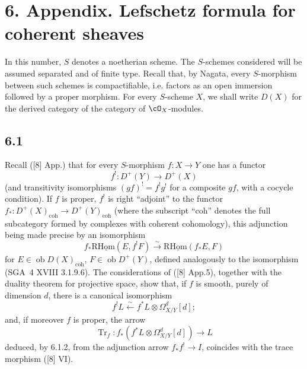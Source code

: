 \section*{6. Appendix. Lefschetz formula for coherent sheaves}

In this number, $S$ denotes a noetherian scheme. The $S$-schemes considered will be assumed separated and of finite type. Recall that, by Nagata, every $S$-morphism between such schemes is compactifiable, i.e. factors as an open immersion followed by a proper morphism. For every $S$-scheme $X$, we shall write $D(X)$ for the derived category of the category of $\cO_X$-modules.

\subsection*{6.1}
Recall ([8] App.) that for every $S$-morphism $f:X\to Y$ one has a functor
\[
f^!:D^+(Y)\longrightarrow D^+(X)
\]
(and transitivity isomorphisms $(gf)^! = f^!g^!$ for a composite $gf$, with a cocycle condition). If $f$ is proper, $f^!$ is right ``adjoint'' to the functor $f_*:D^+(X)_{\mathrm{coh}}\to D^+(Y)_{\mathrm{coh}}$ (where the subscript ``coh'' denotes the full subcategory formed by complexes with coherent cohomology), this adjunction being made precise by an isomorphism
\begin{equation}
\tag{6.1.1}
f_*\mathrm{R}\underline{\mathrm{Hom}}(E,f^!F)\xrightarrow{\sim}\mathrm{R}\underline{\mathrm{Hom}}(f_*E,F)
\end{equation}
for $E\in\operatorname{ob}D(X)_{\mathrm{coh}}$, $F\in\operatorname{ob}D^+(Y)$, defined analogously to the isomorphism (SGA~4 XVIII 3.1.9.6). The considerations of ([8] App.5), together with the duality theorem for projective space, show that, if $f$ is smooth, purely of dimension $d$, there is a canonical isomorphism
\begin{equation}
\tag{6.1.2}
f^!L\xleftarrow{\sim} f^*L\otimes\Omega^d_{X/Y}[d];
\end{equation}
and, if moreover $f$ is proper, the arrow
\begin{equation}
\tag{6.1.3}
\operatorname{Tr}_f:f_*(f^*L\otimes\Omega^d_{X/Y}[d])\longrightarrow L
\end{equation}
deduced, by 6.1.2, from the adjunction arrow $f_*f^!\to I$, coincides with the trace morphism ([8] VI).

